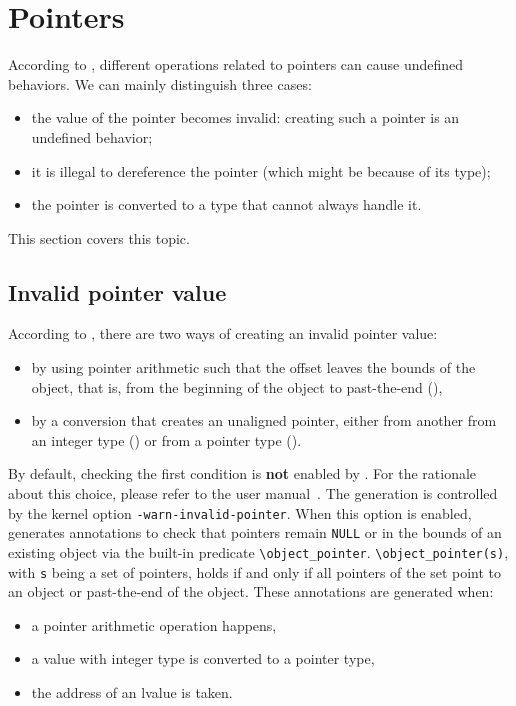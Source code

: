 \section{Pointers}

According to \cnn{}, different operations related to pointers can cause
undefined behaviors. We can mainly distinguish three cases:
\begin{itemize}
  \item the value of the pointer becomes invalid: creating such a pointer is an
    undefined behavior;
  \item it is illegal to dereference the pointer (which might be because of its
    type);
  \item the pointer is converted to a type that cannot always handle it.
\end{itemize}
This section covers this topic.

\subsection{Invalid pointer value}
\label{subsec:invalid-pointer}

According to \cnn{}, there are two ways of creating an invalid pointer value:
\begin{itemize}
  \item by using pointer arithmetic such that the offset leaves the bounds
    of the object, that is, from the beginning of the object to past-the-end
    (),
  \item by a conversion that creates an unaligned pointer, either from another
    from an integer type () or from a pointer type
    ().
\end{itemize}

By default, checking the first condition is \textbf{not} enabled by \framac{}. For
the rationale about this choice, please refer to the \framac{} user
manual~\cite{userman}. The generation is controlled by the kernel option
{\tt -warn-invalid-pointer}. When this option is enabled, \rte{} generates
annotations to check that pointers remain {\tt NULL} or in the bounds of an
existing object via the \acsl{} built-in predicate \lstinline{\object_pointer}.
\lstinline{\object_pointer(s)}, with \lstinline|s| being a set of pointers, holds
if and only if all pointers of the set point to an object or past-the-end of the
object. These annotations are generated when:
\begin{itemize}
  \item a pointer arithmetic operation happens,
  \item a value with integer type is converted to a pointer type,
  \item the address of an lvalue is taken.
\end{itemize}

